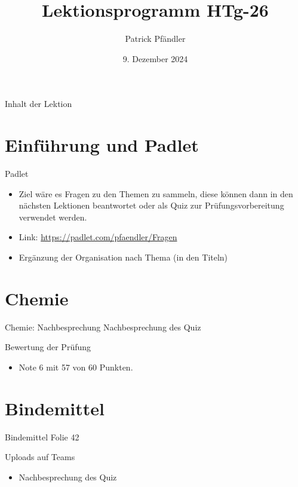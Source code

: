 



\title{\textbf{Lektionsprogramm HTg-26}}
\author{Patrick Pfändler}
\date{9. Dezember 2024}




\frame{\titlepage}

\begin{frame}{Inhalt der Lektion}
    \tableofcontents
\end{frame}


\section{Einführung und Padlet}

\begin{frame}{Padlet}
\begin{itemize}
	\item[\textbullet] Ziel wäre es Fragen zu den Themen zu sammeln, diese können dann in den nächsten Lektionen beantwortet oder als Quiz zur Prüfungsvorbereitung verwendet werden.
	\item[\textbullet] Link: \url{https://padlet.com/pfaendler/Fragen}
	\item[\textbullet] Ergänzung der Organisation nach Thema (in den Titeln)
\end{itemize}
\end{frame}


\section{Chemie}
\begin{frame}{Chemie: Nachbesprechung}
    Nachbesprechung des Quiz
\end{frame}



\begin{frame}{Bewertung der Prüfung}
    \begin{itemize}
        \item [\textbullet] Note 6 mit 57 von 60 Punkten.
    \end{itemize}

\end{frame}



\section{Bindemittel}
\begin{frame}{Bindemittel}
    Folie 42
\end{frame}




\begin{frame}{Uploads auf Teams}
    \begin{itemize}
        \item [\textbullet] Nachbesprechung des Quiz
    \end{itemize}
\end{frame}


\folieFragen

